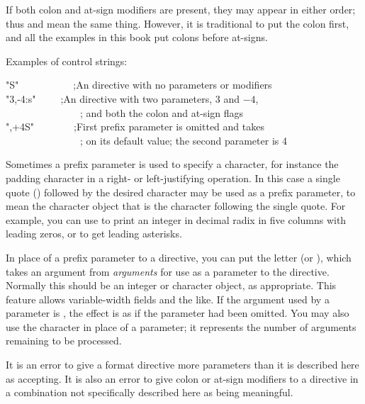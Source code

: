 \begin{defun}[Function]
If both colon and at-sign modifiers are present, they may appear
in either order; thus  and 
mean the same thing.  However, it is traditional to put the colon first, and all the
examples in this book put colons before at-signs.

Examples of control strings:
\begin{lisp}
"{\Xtilde}S"~~~~~~~~~~~;\textrm{An  directive with no parameters or modifiers} \\
"{\Xtilde}3,-4:{\Xatsign}s"~~~~~;\textrm{An  directive with two parameters, 3 and $-4$,} \\
~~~~~~~~~~~~~~~; \textrm{and both the colon and at-sign flags} \\
"{\Xtilde},+4S"~~~~~~~~;\textrm{First prefix parameter is omitted and takes} \\
~~~~~~~~~~~~~~~; \textrm{on its default value; the second parameter is 4}
\end{lisp}
Sometimes a prefix parameter is used to specify a character, for
instance the padding character in a right- or left-justifying operation.
In this case a single quote () followed by the desired
character may be used as a prefix parameter, to mean the character
object that is the character following the single quote.  For
example, you can use 
to print an integer in decimal radix in five columns with leading zeros,
or  to get leading asterisks.

In place of a prefix parameter to a directive, you can put the letter
 (or ), which takes an argument from \emph{arguments} for use as a parameter to
the directive.  Normally this should be an integer or character object,
as appropriate.  This feature allows variable-width fields and the like.
If the argument used by a  parameter is {\nil},
the effect is as if the parameter had been omitted.
You may also use the character \cd{\#} in place of a parameter; it
represents the number of arguments remaining to be processed.

It is an error to give a format directive more parameters than
it is described here as accepting.  It is also an error to give
colon or at-sign modifiers to a directive in a combination not
specifically described here as being meaningful.
\end{defun}


